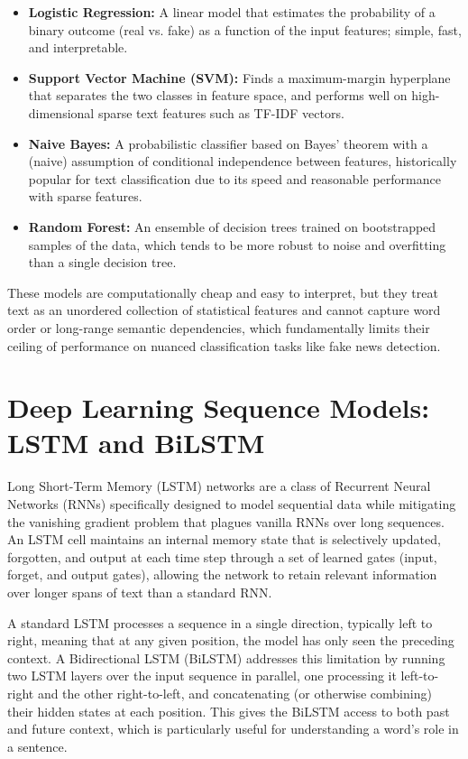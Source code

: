 \begin{itemize}
\item \textbf{Logistic Regression:} A linear model that estimates the probability of a binary outcome (real vs. fake) as a function of the input features; simple, fast, and interpretable.
\item \textbf{Support Vector Machine (SVM):} Finds a maximum-margin hyperplane that separates the two classes in feature space, and performs well on high-dimensional sparse text features such as TF-IDF vectors.
\item \textbf{Naive Bayes:} A probabilistic classifier based on Bayes' theorem with a (naive) assumption of conditional independence between features, historically popular for text classification due to its speed and reasonable performance with sparse features.
\item \textbf{Random Forest:} An ensemble of decision trees trained on bootstrapped samples of the data, which tends to be more robust to noise and overfitting than a single decision tree.
\end{itemize}

These models are computationally cheap and easy to interpret, but they treat text as an unordered collection of statistical features and cannot capture word order or long-range semantic dependencies, which fundamentally limits their ceiling of performance on nuanced classification tasks like fake news detection.

\section{Deep Learning Sequence Models: LSTM and BiLSTM}

Long Short-Term Memory (LSTM) networks are a class of Recurrent Neural Networks (RNNs) specifically designed to model sequential data while mitigating the vanishing gradient problem that plagues vanilla RNNs over long sequences. An LSTM cell maintains an internal memory state that is selectively updated, forgotten, and output at each time step through a set of learned gates (input, forget, and output gates), allowing the network to retain relevant information over longer spans of text than a standard RNN.

A standard LSTM processes a sequence in a single direction, typically left to right, meaning that at any given position, the model has only seen the preceding context. A Bidirectional LSTM (BiLSTM) addresses this limitation by running two LSTM layers over the input sequence in parallel, one processing it left-to-right and the other right-to-left, and concatenating (or otherwise combining) their hidden states at each position. This gives the BiLSTM access to both past and future context, which is particularly useful for understanding a word's role in a sentence.

